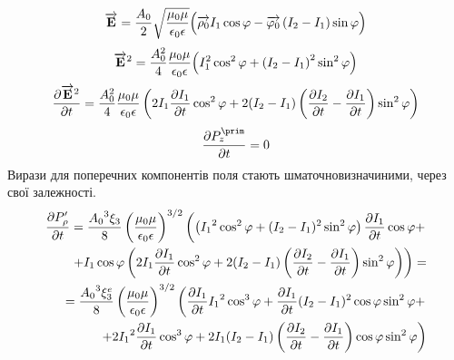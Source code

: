 %
\textcolor{lightgray}{ \begin{equation*} \label{eq:linear_e_cyl}
\overrightarrow{\mathbf E} = \frac{A_0}{2} \sqrt{\frac{\mu_0 \mu}{\epsilon_0 \epsilon}}
\Big( \overrightarrow{\mathbf \rho_0} I_1 \cos \varphi - 
\overrightarrow{\mathbf  \varphi_0 } \left( I_2 - I_1 \right) \sin \varphi \Big)
\end{equation*} }
%
\textcolor{lightgray}{ \begin{equation*} \begin{aligned}
\overrightarrow{\mathbf E}^2 = \frac{A_0^2}{4} \frac{\mu_0 \mu}{\epsilon_0 \epsilon}
\Big( I_1^2 \cos^2 \varphi + \left( I_2 - I_1 \right)^2 \sin^2 \varphi \Big)
\end{aligned} \end{equation*} }
%
\textcolor{lightgray}{ \begin{equation*} \begin{aligned}
\frac{\partial  \overrightarrow{\mathbf E}^2 }{\partial t} = \frac{A_0^2}{4} 
\frac{\mu_0 \mu}{\epsilon_0 \epsilon}
\left( 2 I_1 \frac{\partial I_1}{\partial t} \cos^2 \varphi + 
2 ( I_2 - I_1 ) \left( \frac{\partial I_2}{\partial t} - \frac{\partial I_1}{\partial t} \right) 
\sin^2 \varphi \right)
\end{aligned} \end{equation*} }
%
\begin{equation*} \begin{aligned}
\partder{P_z^\prim}{t} = 0
\end{aligned} \end{equation*}
%
Вирази для поперечних компонентів поля стають шматочновизначиними,
через свої залежності.
%
\textcolor{lightgray} { \begin{equation*} \begin{aligned}
\frac{\partial P_\rho^\prime}{\partial t}   = \frac{ {A_0}^3 \xi_3 }{ 8 } 
\left( \frac{\mu_0 \mu} {\epsilon_0 \epsilon} \right)^{3/2} \left(
\left( {I_1}^2 \cos^2 \varphi + ( I_2 - I_1 )^2 \sin^2 \varphi \right)
\frac{\partial I_1}{\partial t} \cos \varphi + \right. \\
\left. + I_1 \cos \varphi \left( 2 I_1 \frac{\partial I_1}{\partial t} \cos^2 \varphi + 
2 ( I_2 - I_1 ) \left( \frac{\partial I_2}{\partial t} - \frac{\partial I_1}{\partial t} \right) 
\sin^2 \varphi \right) \right) = \\ = \frac{ {A_0}^3 \xi_3^e }{ 8 } 
\left( \frac{\mu_0 \mu} {\epsilon_0 \epsilon} \right)^{3/2} \left(
\frac{\partial I_1}{\partial t} {I_1}^2 \cos^3 \varphi + \frac{\partial I_1}{\partial t} ( I_2 - I_1 )^2 
\cos \varphi \sin^2 \varphi + \right. \\
\left. + 2 {I_1}^2 \frac{\partial I_1}{\partial t} \cos^3 \varphi + 
2 I_1 ( I_2 - I_1 ) \left( \frac{\partial I_2}{\partial t} - \frac{\partial I_1}{\partial t} \right) 
\cos \varphi \sin^2 \varphi \right)
\end{aligned} \end{equation*} }
